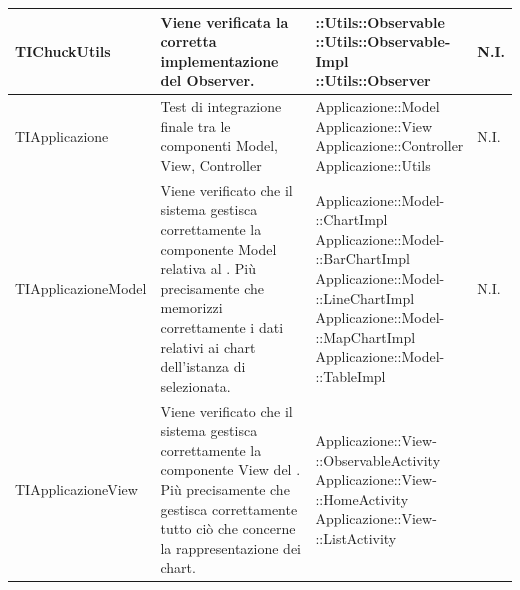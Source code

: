 \begin{longtabu}{| X | X | X[0.9] | X[0.3] |}
	TIChuckUtils &
Viene verificata la corretta implementazione del  Observer.
			& \parbox[t]{0.6\textwidth}{
::Utils::Observable\\
::Utils::Observable-\\Impl\\
::Utils::Observer}
			& N.I.
			\\ \hline










			TIApplicazione &
			Test di integrazione finale tra le componenti Model, View, Controller
			& \parbox[t]{0.6\textwidth}{
			Applicazione::Model\\
			Applicazione::View\\
			Applicazione::Controller\\
			Applicazione::Utils}
			& N.I.
\\ \hline
			TIApplicazioneModel &
			Viene verificato che il sistema gestisca correttamente la componente Model relativa al  . Più precisamente che memorizzi correttamente i dati relativi ai chart dell'istanza di  selezionata.
			& \parbox[t]{0.6\textwidth}{
			Applicazione::Model-\\::ChartImpl\\
			Applicazione::Model-\\::BarChartImpl\\
			Applicazione::Model-\\::LineChartImpl\\
			Applicazione::Model-\\::MapChartImpl\\
			Applicazione::Model-\\::TableImpl}
			& N.I.
\\ \hline
			TIApplicazioneView &
			Viene verificato che il sistema gestisca correttamente la componente View del  . Più precisamente che gestisca correttamente tutto ciò che concerne la rappresentazione dei chart.
			& \parbox[t]{0.6\textwidth}{
			Applicazione::View-\\::ObservableActivity\\
			Applicazione::View-\\::HomeActivity\\
			Applicazione::View-\\::ListActivity\\
}
\end{longtabu}
